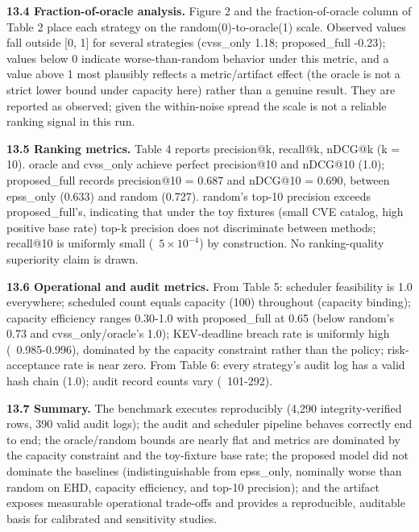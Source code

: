 \textbf{13.4 Fraction-of-oracle analysis.} Figure 2 and the fraction-of-oracle column of
Table 2 place each strategy on the random(0)-to-oracle(1) scale. Observed values
fall outside [0, 1] for several strategies (cvss\_only 1.18; proposed\_full -0.23);
values below 0 indicate worse-than-random behavior under this metric, and a value
above 1 most plausibly reflects a metric/artifact effect (the oracle is not a
strict lower bound under capacity here) rather than a genuine result. They are
reported as observed; given the within-noise spread the scale is not a reliable
ranking signal in this run.

\textbf{13.5 Ranking metrics.} Table 4 reports precision@k, recall@k, nDCG@k (k = 10).
oracle and cvss\_only achieve perfect precision@10 and nDCG@10 (1.0); proposed\_full
records precision@10 = 0.687 and nDCG@10 = 0.690, between epss\_only (0.633) and
random (0.727). random's top-10 precision exceeds proposed\_full's, indicating that
under the toy fixtures (small CVE catalog, high positive base rate) top-k precision
does not discriminate between methods; recall@10 is uniformly small (~$5 \times 10^{-4}$) by
construction. No ranking-quality superiority claim is drawn.

\textbf{13.6 Operational and audit metrics.} From Table 5: scheduler feasibility is 1.0
everywhere; scheduled count equals capacity (100) throughout (capacity binding);
capacity efficiency ranges 0.30-1.0 with proposed\_full at 0.65 (below random's 0.73
and cvss\_only/oracle's 1.0); KEV-deadline breach rate is uniformly high
(~0.985-0.996), dominated by the capacity constraint rather than the policy;
risk-acceptance rate is near zero. From Table 6: every strategy's audit log has a
valid hash chain (1.0); audit record counts vary (~101-292).

\textbf{13.7 Summary.} The benchmark executes reproducibly (4,290 integrity-verified
rows, 390 valid audit logs); the audit and scheduler pipeline behaves correctly end
to end; the oracle/random bounds are nearly flat and metrics are dominated by the
capacity constraint and the toy-fixture base rate; the proposed model did not
dominate the baselines (indistinguishable from epss\_only, nominally worse than
random on EHD, capacity efficiency, and top-10 precision); and the artifact
exposes measurable operational trade-offs and provides a reproducible, auditable
basis for calibrated and sensitivity studies.
